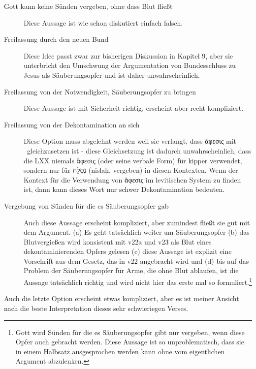 \begin{description}
	\item[Gott kann keine Sünden vergeben, ohne dass Blut fließt] Diese Aussage ist wie schon diskutiert einfach falsch.
	\item[Freilassung durch den neuen Bund] Diese Idee passt zwar zur bisherigen Diskussion in Kapitel 9, aber sie unterbricht den Umschwung der Argumentation von Bundesschluss zu Jesus als Säuberungsopfer und ist daher unwahrscheinlich.
	\item[Freilassung von der Notwendigkeit, Säuberungsopfer zu bringen] Diese Aussage ist mit Sicherheit richtig, erscheint aber recht kompliziert.
	\item[Freilassung von der Dekontamination an sich] Diese Option muss abgelehnt werden weil sie verlangt, dass ἄφεσις mit \kipper\ gleichzusetzen ist - diese Gleichsetzung ist dadurch unwahrscheinlich, dass die LXX niemals ἄφεσις (oder seine verbale Form) für kipper verwendet, sondern nur für נִסְלַח (nislaḥ, vergeben) in diesen Kontexten.
		Wenn der Kontext für die Verwendung von ἄφεσις im levitischen System zu finden ist, dann kann dieses Wort nur schwer Dekontamination bedeuten.
	\item[Vergebung von Sünden für die es Säuberungsopfer gab] Auch diese Aussage erscheint kompliziert, aber zumindest fließt sie gut mit dem Argument.
		(a) Es geht tatsächlich weiter um Säuberungsopfer
		(b) das Blutvergießen wird konsistent mit v22a und v23 als Blut eines dekontaminierenden Opfers gelesen
		(c) diese Aussage ist explizit eine Vorschrift aus dem Gesetz, das in v22 angebracht wird und
		(d) bis auf das Problem der Säuberungsopfer für Arme, die ohne Blut ablaufen, ist die Aussage tatsächlich richtig und wird nicht hier das erste mal so formuliert.\footnote{
		Gott wird Sünden für die es Säuberungsopfer gibt nur vergeben, wenn diese Opfer auch gebracht werden.
	Diese Aussage ist so unproblematisch, dass sie in einem Halbsatz ausgesprochen werden kann ohne vom eigentlichen Argument abzulenken.}
\end{description}
Auch die letzte Option erscheint etwas kompliziert, aber es ist meiner Ansicht nach die beste Interpretation dieses sehr schwieriegen Verses.

